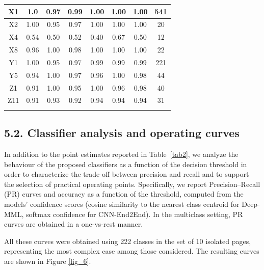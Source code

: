 \documentclass[10pt,onecolumn,letterpaper]{article}
\begin{document}
\begin{longtable}{|c|c|c|c|c|c|c|c|}
		X1 & 1.0 & 0.97 & 0.99 &1.00&1.00&1.00&541 \\ \hline
		X2 & 1.00 & 0.95 & 0.97   &1.00&1.00&1.00&   20 \\ \hline
		X4 & 0.54 & 0.50 & 0.52    &0.40&0.67&0.50& 12 \\ \hline
		X8 & 0.96 & 1.00 & 0.98   &1.00&1.00&1.00&   22 \\ \hline
		Y1 & 1.00 & 0.95 & 0.97 &0.99&0.99&0.99& 221 \\ \hline
		Y5 & 0.94 & 1.00 & 0.97   &0.96&1.00&0.98&   44 \\ \hline
		Z1 & 0.91 & 1.00 & 0.95   &1.00&0.96&0.98&   40 \\ \hline
		Z11 & 0.91 & 0.93 & 0.92   &0.94&0.94&0.94&  31 \\ \hline
	\label{tab3}
\end{longtable}
\normalsize


\subsection{5.2. Classifier analysis and operating curves}

In addition to the point estimates reported in Table~\ref{tab2}, we analyze the behaviour of the proposed classifiers as a function of the decision threshold in order to characterize the trade-off between precision and recall and to support the selection of practical operating points. Specifically, we report Precision--Recall (PR) curves and accuracy as a function of the threshold, computed from the models' confidence scores (cosine similarity to the nearest class centroid for Deep-MML, softmax confidence for CNN-End2End). In the multiclass setting, PR curves are obtained in a one-vs-rest manner.

All these curves were obtained using 222 classes in the set of 10 isolated pages, representing the most complex case among those considered. The resulting curves are shown in Figure \ref{fig_6}.
\end{document}
